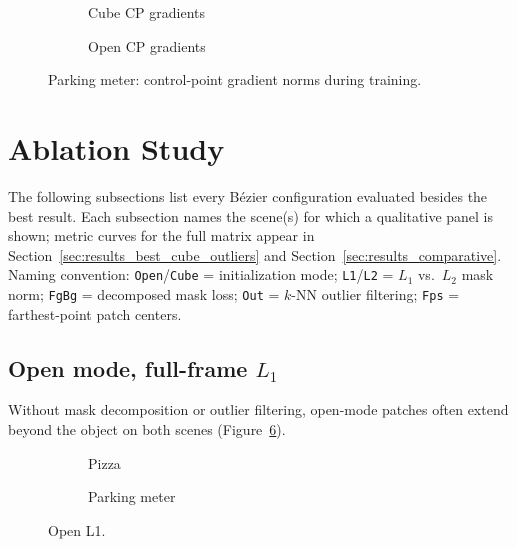 \begin{figure}[H]
    \centering
    \begin{subfigure}[t]{0.49\textwidth}
        \centering
        \caption{Cube CP gradients}
        \label{fig:parking_cube_gradients}
    \end{subfigure}
    \hfill
    \begin{subfigure}[t]{0.49\textwidth}
        \centering
        \caption{Open CP gradients}
        \label{fig:parking_open_gradients}
    \end{subfigure}
    \caption{Parking meter: control-point gradient norms during training.}
\end{figure}

\section{Ablation Study}
\label{sec:results_ablation}

The following subsections list every B\'ezier configuration evaluated besides the best result. Each subsection names the scene(s) for which a qualitative panel is shown; metric curves for the full matrix appear in Section~\ref{sec:results_best_cube_outliers} and Section~\ref{sec:results_comparative}. Naming convention: \texttt{Open}/\texttt{Cube} = initialization mode; \texttt{L1}/\texttt{L2} = $L_1$ vs.\ $L_2$ mask norm; \texttt{FgBg} = decomposed mask loss; \texttt{Out} = $k$-NN outlier filtering; \texttt{Fps} = farthest-point patch centers.

\subsection{Open mode, full-frame $L_1$}
\label{subsec:ablation_open_l1}

Without mask decomposition or outlier filtering, open-mode patches often extend beyond the object on both scenes (Figure~\ref{fig:ablation_open_l1}).

\begin{figure}[H]
    \centering
    \begin{subfigure}{\textwidth}
        \centering
        \caption{Pizza}
        \label{fig:ablation_open_l1_pizza}
    \end{subfigure}
    \vspace{0.6em}
    \begin{subfigure}{\textwidth}
        \centering
        \caption{Parking meter}
        \label{fig:ablation_open_l1_parking}
    \end{subfigure}
    \caption{Open L1.}
    \label{fig:ablation_open_l1}
\end{figure}

